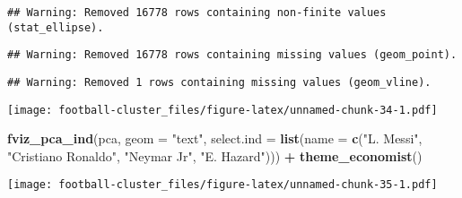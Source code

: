 \documentclass[]{article}
\newenvironment{Shaded}{\begin{snugshade}}{\end{snugshade}}
\newcommand{\DataTypeTok}[1]{\textcolor[rgb]{0.13,0.29,0.53}{#1}}
\newcommand{\KeywordTok}[1]{\textcolor[rgb]{0.13,0.29,0.53}{\textbf{#1}}}
\newcommand{\NormalTok}[1]{#1}
\newcommand{\OperatorTok}[1]{\textcolor[rgb]{0.81,0.36,0.00}{\textbf{#1}}}
\newcommand{\StringTok}[1]{\textcolor[rgb]{0.31,0.60,0.02}{#1}}
\begin{document}
\begin{verbatim}
## Warning: Removed 16778 rows containing non-finite values (stat_ellipse).
\end{verbatim}

\begin{verbatim}
## Warning: Removed 16778 rows containing missing values (geom_point).
\end{verbatim}

\begin{verbatim}
## Warning: Removed 1 rows containing missing values (geom_vline).
\end{verbatim}

\texttt{[image: football-cluster\_files/figure-latex/unnamed-chunk-34-1.pdf]}

\begin{Shaded}
\begin{Highlighting}[]
\KeywordTok{fviz_pca_ind}\NormalTok{(pca, }\DataTypeTok{geom =} \StringTok{"text"}\NormalTok{, }
             \DataTypeTok{select.ind =} \KeywordTok{list}\NormalTok{(}\DataTypeTok{name =} \KeywordTok{c}\NormalTok{(}\StringTok{"L. Messi"}\NormalTok{, }
                                        \StringTok{"Cristiano Ronaldo"}\NormalTok{, }\StringTok{"Neymar Jr"}\NormalTok{, }\StringTok{"E. Hazard"}\NormalTok{))) }\OperatorTok{+}\StringTok{ }
\StringTok{  }\KeywordTok{theme_economist}\NormalTok{()}
\end{Highlighting}
\end{Shaded}

\texttt{[image: football-cluster\_files/figure-latex/unnamed-chunk-35-1.pdf]}
\end{document}
